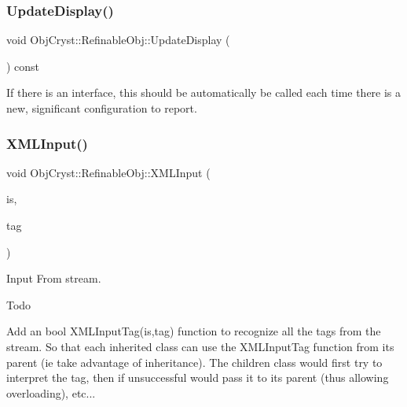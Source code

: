 \subsubsection{\texorpdfstring{UpdateDisplay()}{UpdateDisplay()}}
{\footnotesize\ttfamily void Obj\+Cryst\+::\+Refinable\+Obj\+::\+Update\+Display (\begin{DoxyParamCaption}{ }\end{DoxyParamCaption}) const\hspace{0.3cm}{\ttfamily [virtual]}}

If there is an interface, this should be automatically be called each time there is a \textquotesingle{}new, significant\textquotesingle{} configuration to report. \mbox{\label{class_obj_cryst_1_1_refinable_obj_a3e3466a6945fec22d5f371a1a1478b62}} 
\subsubsection{\texorpdfstring{XMLInput()}{XMLInput()}}
{\footnotesize\ttfamily void Obj\+Cryst\+::\+Refinable\+Obj\+::\+X\+M\+L\+Input (\begin{DoxyParamCaption}\item[{istream \&}]{is,  }\item[{const \mbox{\hyperlink{class_obj_cryst_1_1_x_m_l_cryst_tag}{X\+M\+L\+Cryst\+Tag}} \&}]{tag }\end{DoxyParamCaption})\hspace{0.3cm}{\ttfamily [virtual]}}



Input From stream. 

\begin{DoxyRefDesc}{Todo}
\item[\mbox{\hyperlink{todo__todo000008}{Todo}}]Add an bool X\+M\+L\+Input\+Tag(is,tag) function to recognize all the tags from the stream. So that each inherited class can use the X\+M\+L\+Input\+Tag function from its parent (ie take advantage of inheritance). The children class would first try to interpret the tag, then if unsuccessful would pass it to its parent (thus allowing overloading), etc... \end{DoxyRefDesc}
\mbox{\label{class_obj_cryst_1_1_refinable_obj_a1e57fe5e669121f04f98a2518df1e99f}} 
